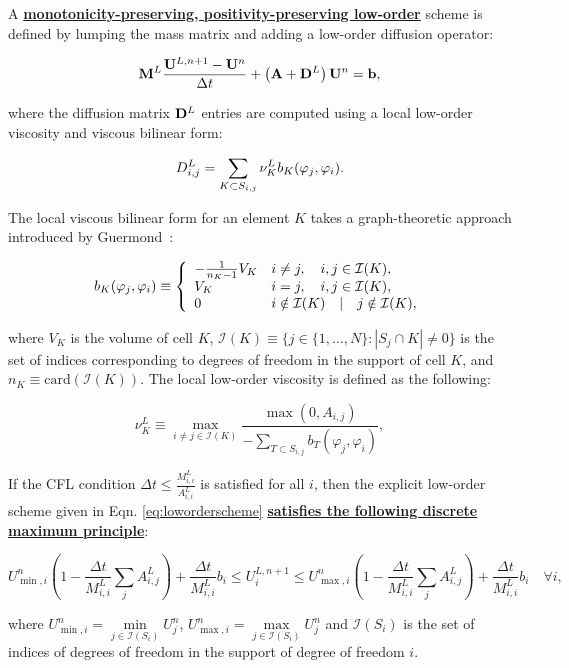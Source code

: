 A \underline{\bf monotonicity-preserving, positivity-preserving low-order} scheme
is defined by lumping the mass matrix and adding a low-order diffusion
operator:

\begin{equation}\label{eq:loworderscheme}
   \mathbf{M}^L\frac{\mathbf{U}^{L,n+1}-\mathbf{U}^n}{\Delta t}
      +\left(\mathbf{A}+\textcolor{black}{\mathbf{D}^L}\right)\mathbf{U}^n = \mathbf{b},
\end{equation}

where the diffusion matrix $\textcolor{black}{\mathbf{D}^L}$ entries are computed using a local low-order
viscosity and viscous bilinear form:

\begin{equation}\label{eq:loworderD}
   \textcolor{black}{D^L_{i,j}} = \sum\limits_{K\subset S_{i,j}}\nu_K^L b_K(\varphi_j,\varphi_i).
\end{equation}

The local viscous bilinear form for an element $K$ takes a graph-theoretic
approach introduced by Guermond~\cite{guermond_firstorder}:

\begin{equation}\label{eq:bilinearform}
      b_K(\varphi_j, \varphi_i) \equiv \left\{\begin{array}{l l}
         -\frac{1}{n_K - 1}V_K & i\ne j, \quad i,j\in \mathcal{I}(K),\\
         V_K                   & i = j,  \quad i,j\in \mathcal{I}(K),\\
         0                     & i\notin\mathcal{I}(K) \quad | \quad j\notin\mathcal{I}(K),
      \end{array}\right.
\end{equation}

where $V_K$ is the volume of cell $K$,
$\mathcal{I}(K)\equiv \{j\in\{1,\ldots,N\}: |S_j\cap K|\ne 0\}$
is the set of indices corresponding to degrees of freedom in
the support of cell $K$, and $n_K \equiv \mbox{card}(\mathcal{I}(K))$.
The local low-order viscosity is defined as the following:

\begin{equation}
   \nu_K^L \equiv \max\limits_{i\ne j\in \mathcal{I}(K)}\frac{\max(0,A_{i,j})}
      {-\sum\limits_{T\subset S_{i,j}} b_T(\varphi_j, \varphi_i)},
\end{equation}

If the CFL condition $\Delta t \leq \frac{M_{i,i}^L}{A_{i,i}^L}$
is satisfied for all $i$, then the explicit
low-order scheme given in Eqn. \ref{eq:loworderscheme} \underline{\bf satisfies the following
discrete maximum principle}:

\begin{equation}\label{eq:dmp}
   U_{\min,i}^n\left(1-\frac{\Delta t}{M_{i,i}^L}
      \sum\limits_j A^L_{i,j}\right)
      + \frac{\Delta t}{M_{i,i}^L}b_i\leq
   U_i^{L,n+1}\leq
   U_{\max,i}^n\left(1-\frac{\Delta t}{M_{i,i}^L}
      \sum\limits_j A^L_{i,j}\right)
      + \frac{\Delta t}{M_{i,i}^L}b_i\quad\forall i,
\end{equation}

where $U_{\min,i}^n = \min\limits_{j\in \mathcal{I}(S_i)}U_j^n$,
$U_{\max,i}^n = \max\limits_{j\in \mathcal{I}(S_i)}U_j^n$
and $\mathcal{I}(S_i)$ is the set of indices of degrees of freedom in the
support of degree of freedom $i$.
